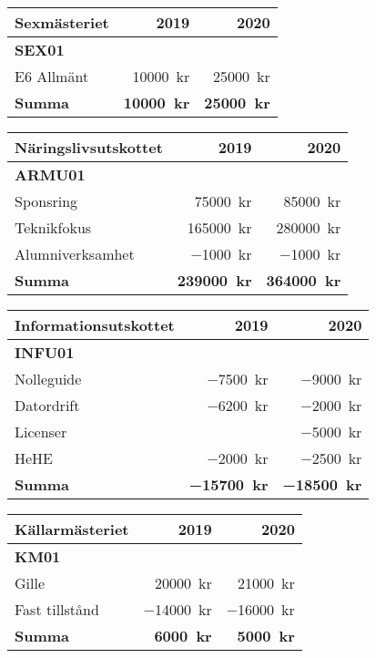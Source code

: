\documentclass[../_main/handlingar.tex]{subfiles}
\begin{document}
\begin{tabularx}{10cm}{X r r}
    \textbf{\large Sexmästeriet} & \textbf{2019} & \textbf{2020} \\
    \hline
    \textbf{SEX01} \\
    E6 Allmänt & \SI{10000}{kr} & \SI{25000}{kr} \\
    \hline
    \textbf{Summa} & \textbf{\SI{10000}{kr}} & \textbf{\SI{25000}{kr}} \\
\end{tabularx}

\begin{tabularx}{10cm}{X r r}
    \textbf{\large Näringslivsutskottet} & \textbf{2019} & \textbf{2020} \\
    \hline
    \textbf{ARMU01} \\
    Sponsring & \SI{75000}{kr} & \SI{85000}{kr} \\
    Teknikfokus & \SI{165000}{kr} & \SI{280000}{kr} \\
    Alumniverksamhet & \SI{-1000}{kr} & \SI{-1000}{kr} \\
    \hline
    \textbf{Summa} & \textbf{\SI{239000}{kr}} & \textbf{\SI{364000}{kr}} \\
\end{tabularx}

\begin{tabularx}{10cm}{X r r}
    \textbf{\large Informationsutskottet} & \textbf{2019} & \textbf{2020} \\
    \hline
    \textbf{INFU01} \\
    Nolleguide & \SI{-7500}{kr} & \SI{-9000}{kr} \\
    Datordrift & \SI{-6200}{kr} & \SI{-2000}{kr} \\
    Licenser & & \SI{-5000}{kr} \\
    HeHE & \SI{-2000}{kr} & \SI{-2500}{kr} \\
    \hline
    \textbf{Summa} & \textbf{\SI{-15700}{kr}} & \textbf{\SI{-18500}{kr}} \\
\end{tabularx}

\begin{tabularx}{10cm}{X r r}
    \textbf{\large Källarmästeriet} & \textbf{2019} & \textbf{2020} \\
    \hline
    \textbf{KM01} \\
    Gille & \SI{20000}{kr} & \SI{21000}{kr} \\
    Fast tillstånd & \SI{-14000}{kr} & \SI{-16000}{kr} \\
    \hline
    \textbf{Summa} & \textbf{\SI{6000}{kr}} & \textbf{\SI{5000}{kr}} \\
\end{tabularx}
\end{document}
